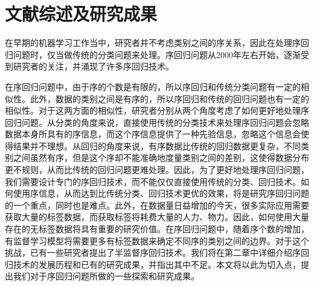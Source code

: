 
\section{文献综述及研究成果}
在早期的机器学习工作当中，研究者并不考虑类别之间的序关系，因此在处理序回归问题时，仅当做传统的分类问题来处理。序回归问题从2000年左右开始，逐渐受到研究者的关注，并涌现了许多序回归技术。

在序回归问题中，由于序的个数是有限的，所以序回归和传统分类问题有一定的相似性。此外，数据的类别之间是有序的，所以序回归和传统的回归问题也有一定的相似性。对于这两方面的相似性，研究者分别从两个角度考虑了如何更好地处理序回归问题。从分类的角度来说，直接使用传统的分类技术来处理序回归问题会忽略数据本身所具有的序信息，而这个序信息提供了一种先验信息，忽略这个信息会使得结果并不理想。从回归的角度来说，有序数据比传统的回归数据更复杂，不同类别之间虽然有序，但是这个序却不能准确地度量类别之间的差别，这使得数据分布更不规则，从而比传统的回归问题更难处理。因此，为了更好地处理序回归问题，我们需要设计专门的序回归技术，而不能仅仅直接使用传统的分类、回归技术。如何使用序信息，从而达到比传统分类、回归技术更优的效果，将是研究序回归问题的一个重点，同时也是难点。此外，在数据量日益增加的今天，很多实际应用需要获取大量的标签数据，而获取标签将耗费大量的人力、物力。因此，如何使用大量存在的无标签数据将具有重要的研究价值。在序回归问题中，随着序个数的增加，有监督学习模型将需要更多有标签数据来确定不同序的类别之间的边界。对于这个挑战，已有一些研究者提出了半监督序回归技术。我们将在第二章中详细介绍序回归技术的发展历程和已有的研究成果，并指出其中不足。本文将以此为切入点，提出我们对于序回归问题所做的一些探索和研究成果。



